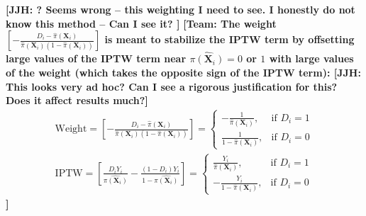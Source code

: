 \noindent \textbf{[JJH: ? Seems wrong -- this weighting I need to see. I honestly do not know this method -- Can I see it? ]} \textbf{[Team: The weight $\left[-\frac{D_i - \hat{\pi}(\boldsymbol{X}_i)}{\hat{\pi}(\boldsymbol{X}_i) (1-\hat{\pi}(\boldsymbol{X}_i))}\right]$ is meant to stabilize the IPTW term by offsetting large values of the IPTW term near $\hat{\pi(\boldsymbol{X}_i)} = 0$ or $1$ with large values of the weight (which takes the opposite sign of the IPTW term): \textbf{[JJH: This looks very ad hoc? Can I see a rigorous justification for this? Does it affect results much?]} \\
\begin{align*}
	\text{Weight} = \left[-\frac{D_i - \hat{\pi}(\boldsymbol{X}_i)}{\hat{\pi}(\boldsymbol{X}_i) (1-\hat{\pi}(\boldsymbol{X}_i))}\right] =
	 \begin{cases}
		-\frac{1}{\hat{\pi}(\boldsymbol{X}_i)}, &\text{if  } D_i=1 \\
		\frac{1}{1-\hat{\pi}(\boldsymbol{X}_i)}, &\text{if  } D_i=0
	\end{cases} \\[10pt]
	\text{IPTW}= \left[\frac{D_i Y_i}{\hat{\pi(\boldsymbol{X}_i)}} - \frac{(1-D_i)Y_i}{1-\hat{\pi(\boldsymbol{X}_i)}}\right]=
	 \begin{cases}
		\frac{Y_i}{\hat{\pi}(\boldsymbol{X}_i)}, &\text{if  } D_i=1 \\
		-\frac{Y_i}{1-\hat{\pi}(\boldsymbol{X}_i)}, &\text{if  } D_i=0
	\end{cases}
\end{align*}
]}\\

